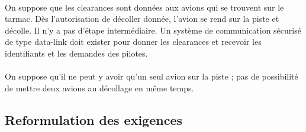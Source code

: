 \paragraph{}
On suppose que les clearances sont données aux avions qui se trouvent sur le tarmac. Dès l'autorisation de décoller donnée, l'avion se rend sur la piste et décolle. Il n'y a pas d'étape intermédiaire. Un système de communication sécurisé de type data-link doit exister pour donner les clearances et recevoir les identifiants et les demandes des pilotes.

\paragraph{}
On suppose qu'il ne peut y avoir qu'un seul avion sur la piste ; pas de possibilité
de mettre deux avions au décollage en même temps.


\subsection{Reformulation des exigences}

